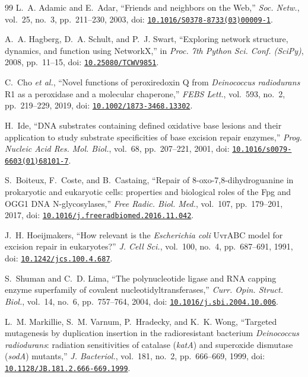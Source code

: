 \documentclass[conference]{IEEEtran}
\begin{document}
\begin{thebibliography}{99}
L.~A. Adamic and E.~Adar, ``Friends and neighbors on the Web,'' \emph{Soc. Netw.}, vol.~25,
no.~3, pp.~211--230, 2003,
doi: \href{https://doi.org/10.1016/S0378-8733(03)00009-1}{\nolinkurl{10.1016/S0378-8733(03)00009-1}}.

A.~A. Hagberg, D.~A. Schult, and P.~J. Swart, ``Exploring network structure, dynamics, and
function using NetworkX,'' in \emph{Proc. 7th Python Sci. Conf. (SciPy)}, 2008, pp.~11--15,
doi: \href{https://doi.org/10.25080/TCWV9851}{\nolinkurl{10.25080/TCWV9851}}.

C.~Cho \emph{et al.}, ``Novel functions of peroxiredoxin Q from \emph{Deinococcus radiodurans} R1
as a peroxidase and a molecular chaperone,'' \emph{FEBS Lett.}, vol.~593, no.~2, pp.~219--229,
2019, doi: \href{https://doi.org/10.1002/1873-3468.13302}{\nolinkurl{10.1002/1873-3468.13302}}.

H.~Ide, ``DNA substrates containing defined oxidative base lesions and their application to study
substrate specificities of base excision repair enzymes,'' \emph{Prog. Nucleic Acid Res. Mol.
Biol.}, vol.~68, pp.~207--221, 2001,
doi: \href{https://doi.org/10.1016/s0079-6603(01)68101-7}{\nolinkurl{10.1016/s0079-6603(01)68101-7}}.

S.~Boiteux, F.~Coste, and B.~Castaing, ``Repair of 8-oxo-7,8-dihydroguanine in prokaryotic and
eukaryotic cells: properties and biological roles of the Fpg and OGG1 DNA N-glycosylases,''
\emph{Free Radic. Biol. Med.}, vol.~107, pp.~179--201, 2017,
doi: \href{https://doi.org/10.1016/j.freeradbiomed.2016.11.042}{\nolinkurl{10.1016/j.freeradbiomed.2016.11.042}}.

J.~H. Hoeijmakers, ``How relevant is the \emph{Escherichia coli} UvrABC model for excision repair in
eukaryotes?'' \emph{J. Cell Sci.}, vol.~100, no.~4, pp.~687--691, 1991,
doi: \href{https://doi.org/10.1242/jcs.100.4.687}{\nolinkurl{10.1242/jcs.100.4.687}}.

S.~Shuman and C.~D. Lima, ``The polynucleotide ligase and RNA capping enzyme superfamily of covalent
nucleotidyltransferases,'' \emph{Curr. Opin. Struct. Biol.}, vol.~14, no.~6, pp.~757--764, 2004,
doi: \href{https://doi.org/10.1016/j.sbi.2004.10.006}{\nolinkurl{10.1016/j.sbi.2004.10.006}}.

L.~M. Markillie, S.~M. Varnum, P.~Hradecky, and K.~K. Wong, ``Targeted mutagenesis by duplication
insertion in the radioresistant bacterium \emph{Deinococcus radiodurans}: radiation sensitivities
of catalase (\emph{katA}) and superoxide dismutase (\emph{sodA}) mutants,'' \emph{J. Bacteriol.},
vol.~181, no.~2, pp.~666--669, 1999,
doi: \href{https://doi.org/10.1128/JB.181.2.666-669.1999}{\nolinkurl{10.1128/JB.181.2.666-669.1999}}.


\end{thebibliography}
\end{document}
